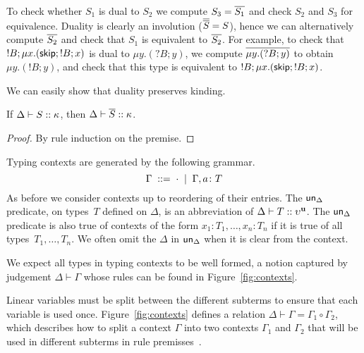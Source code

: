 To check whether $S_1$ is dual to $S_2$ we compute $S_3 = \overline{S_1}$
and check $S_2$ and $S_3$ for equivalence.
%
Duality is clearly an involution ($\overline{\overline{S}} = S$), hence we can
alternatively compute $\overline{S_2}$ and check that $S_1$ is equivalent
to $\overline{S_2}$.
%
For example, to check that $!B;\mu x.(\mathsf{skip};!B;x)$ is dual to
$\mu y.(?B;y)$, we compute $\overline{\mu y.(?B;y)}$ to obtain
$\mu y.(!B;y)$, and check that this type is equivalent to
$!B;\mu x.(\mathsf{skip};!B;x)$.

We can easily show that duality preserves kinding.

\begin{lemma}
  \label{lem:duality-preserves-kinding}
  If $\Delta \vdash S :: \kappa$, then $\Delta \vdash \overline{S} :: \kappa$.
\end{lemma}
%
\begin{proof}
  By rule induction on the premise.
\end{proof}




Typing contexts are generated by the following grammar.
%
\begin{equation*}
  \Gamma \; ::= \; \cdot \;\mid\; \Gamma,a\colon T
\end{equation*}
%
As before we consider contexts up to reordering of their entries.
%
%
The $\mathsf{un}_\Delta$ predicate, on types~$T$ defined on $\Delta$, is an
abbreviation of $\Delta \vdash T :: \upsilon^{\mathbf{u}}$. The $\mathsf{un}_\Delta$
predicate is also true of contexts of the form
$x_1\colon T_1,\dots, x_n\colon T_n$ if it is true of all
types~$T_1,\dots,T_n$. We often omit the $\Delta$ in $\mathsf{un}_\Delta$ when
it is clear from the context.

We expect all types in typing contexts to be well formed, a notion
captured by judgement $\Delta \vdash \Gamma$ whose rules can be found
in Figure~\ref{fig:contexts}.

Linear variables must be split between the different subterms to
ensure that each variable is used once. Figure~\ref{fig:contexts}
defines a relation $\Delta \vdash \Gamma = \Gamma_1 \circ \Gamma_2$,
which describes how to split a context $\Gamma$ into two contexts
$\Gamma_1$ and $\Gamma_2$ that will be used in different subterms in
rule premisses~\cite{walker:substructural-type-systems}.

%


